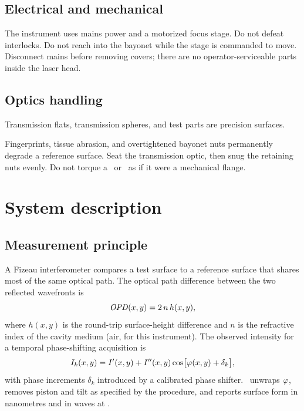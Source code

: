 \section{Electrical and mechanical}

The instrument uses mains power and a motorized focus stage. Do not defeat interlocks. Do not reach into the bayonet while the stage is commanded to move. Disconnect mains before removing covers; there are no operator-serviceable parts inside the laser head.

\section{Optics handling}

Transmission flats, transmission spheres, and test parts are precision surfaces.

\begin{cautionbox}
Fingerprints, tissue abrasion, and overtightened bayonet nuts permanently degrade a reference surface. Seat the transmission optic, then snug the retaining nuts evenly. Do not torque a \TF\ or \TS\ as if it were a mechanical flange.
\end{cautionbox}

\chapter{System description}

\section{Measurement principle}

A Fizeau interferometer compares a test surface to a reference surface that shares most of the same optical path. The optical path difference between the two reflected wavefronts is
\begin{equation}
  \mathit{OPD}(x,y) = 2\,n\,h(x,y),
  \label{eq:opd}
\end{equation}
where $h(x,y)$ is the round-trip surface-height difference and $n$ is the refractive index of the cavity medium (air, for this instrument). The observed intensity for a temporal phase-shifting acquisition is
\begin{equation}
  I_k(x,y) = I'(x,y) + I''(x,y)\cos\bigl[\varphi(x,y) + \delta_k\bigr],
  \label{eq:intensity}
\end{equation}
with phase increments $\delta_k$ introduced by a calibrated phase shifter. \software\ unwraps $\varphi$, removes piston and tilt as specified by the procedure, and reports surface form in nanometres and in waves at \wavelength.

